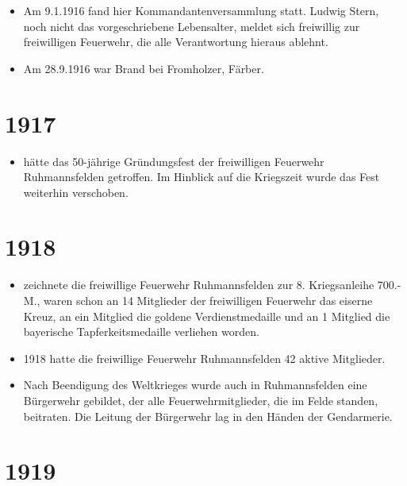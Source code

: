 \documentclass[12pt,a4paper]{book}
\begin{document}
\begin{itemize}
\item Am 9.1.1916 fand hier Kommandantenversammlung statt. Ludwig Stern,
noch nicht das vorgeschriebene Lebensalter, meldet sich freiwillig zur
freiwilligen Feuerwehr, die alle Verantwortung hieraus ablehnt.

\item Am 28.9.1916 war Brand bei Fromholzer, Färber.
\end{itemize}

\section*{1917}

\begin{itemize}
\item hätte das 50-jährige Gründungsfest der freiwilligen Feuerwehr
Ruhmannsfelden getroffen. Im Hinblick auf die Kriegszeit wurde das Fest
weiterhin verschoben.
\end{itemize}

\section*{1918}

\begin{itemize}
\item zeichnete die freiwillige Feuerwehr Ruhmannsfelden zur 8.
Kriegsanleihe 700.- M., waren schon an 14 Mitglieder der freiwilligen
Feuerwehr das eiserne Kreuz, an ein Mitglied die goldene
Verdienstmedaille und an 1 Mitglied die bayerische Tapferkeitsmedaille
verliehen worden.

\item 1918 hatte die freiwillige Feuerwehr Ruhmannsfelden 42 aktive
Mitglieder.

\item Nach Beendigung des Weltkrieges wurde auch in Ruhmannsfelden eine
Bürgerwehr gebildet, der alle Feuerwehrmitglieder, die im Felde standen,
beitraten. Die Leitung der Bürgerwehr lag in den Händen der Gendarmerie.
\end{itemize}

\section*{1919}
\end{document}
